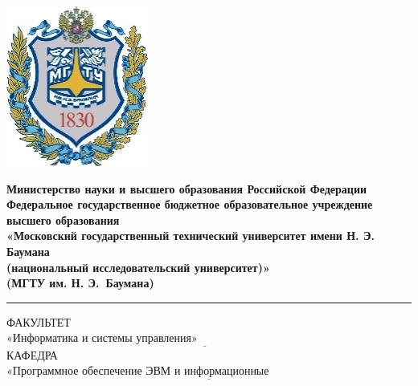 \documentclass[a4paper,14pt, unknownkeysallowed]{extreport}
\begin{document}
	
\begin{titlepage}
	\fontsize{12pt}{12pt}\selectfont
	\noindent \begin{minipage}{0.15\textwidth}
		\includegraphics[width=\linewidth]{img/main_logo.jpg}
	\end{minipage}
	\noindent\begin{minipage}{0.9\textwidth}\centering
		\textbf{Министерство науки и высшего образования Российской Федерации}\\
		\textbf{Федеральное государственное бюджетное образовательное учреждение высшего образования}\\
		\textbf{«Московский государственный технический университет имени \newline Н. Э. Баумана}\\
		\textbf{(национальный исследовательский университет)»}\\
		\textbf{(МГТУ им. Н. Э.~Баумана)}
	\end{minipage}
	
	\noindent\rule{18cm}{3pt}
	\newline\newline
	\noindent ФАКУЛЬТЕТ $\underline{\text{«Информатика и системы управления»~~~~~~~~~~~~~~~~~~~~~~~~~~~~~~~~~~~~~~~~~~~~~~~~~~~~~~~}}$ \newline\newline
	\noindent КАФЕДРА $\underline{\text{«Программное обеспечение ЭВМ и информационные технологии»~~~~~~~~~~~~~~~~~~~~~~~}}$\newline\newline\newline\newline\newline\newline\newline
	

\end{titlepage}
\end{document}
